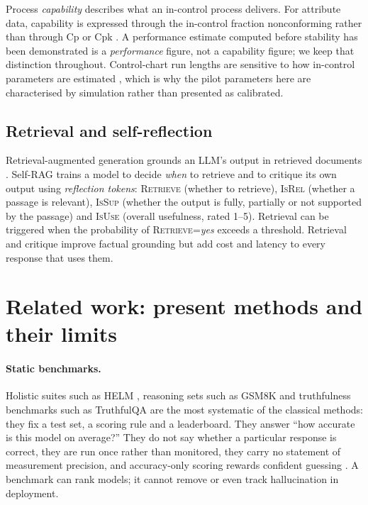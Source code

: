\documentclass[11pt]{article}
\newcommand{\tok}[1]{\textsc{#1}}
\begin{document}
Process \emph{capability} describes what an in-control process delivers. For attribute data, capability is expressed through the in-control fraction nonconforming rather than through Cp or Cpk \citep{montgomery2019}. A performance estimate computed before stability has been demonstrated is a \emph{performance} figure, not a capability figure; we keep that distinction throughout. Control-chart run lengths are sensitive to how in-control parameters are estimated \citep{jensen2006}, which is why the pilot parameters here are characterised by simulation rather than presented as calibrated.

\subsection{Retrieval and self-reflection}
Retrieval-augmented generation grounds an LLM's output in retrieved documents \citep{lewis2020rag}. Self-RAG \citep{asai2024selfrag} trains a model to decide \emph{when} to retrieve and to critique its own output using \emph{reflection tokens}: \tok{Retrieve} (whether to retrieve), \tok{IsRel} (whether a passage is relevant), \tok{IsSup} (whether the output is fully, partially or not supported by the passage) and \tok{IsUse} (overall usefulness, rated 1--5). Retrieval can be triggered when the probability of \tok{Retrieve}=\textit{yes} exceeds a threshold. Retrieval and critique improve factual grounding but add cost and latency to every response that uses them.

\section{Related work: present methods and their limits}\label{sec:related}

\paragraph{Static benchmarks.} Holistic suites such as HELM \citep{liang2023helm}, reasoning sets such as GSM8K \citep{cobbe2021gsm8k} and truthfulness benchmarks such as TruthfulQA \citep{lin2022truthfulqa} are the most systematic of the classical methods: they fix a test set, a scoring rule and a leaderboard. They answer ``how accurate is this model on average?'' They do not say whether a particular response is correct, they are run once rather than monitored, they carry no statement of measurement precision, and accuracy-only scoring rewards confident guessing \citep{kalai2025why}. A benchmark can rank models; it cannot remove or even track hallucination in deployment.
\end{document}
